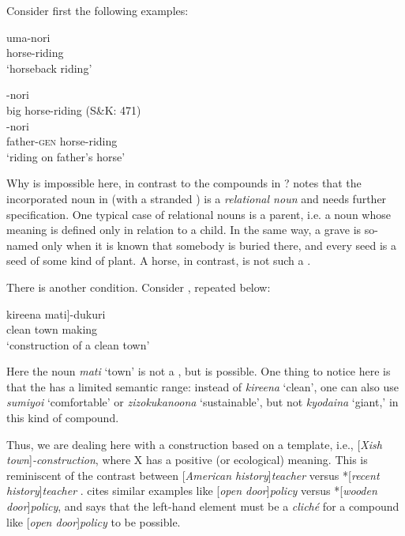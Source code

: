 \documentclass[output=paper]{LSP/langsci}
\begin{document}
  Consider first the following examples:

\ea
 \ea  
 \gll uma-nori\\
    horse-riding\\
\glt ‘horseback riding’

  \ex
  -nori\\
      {\db}{\db}big   horse-riding    (S\&K: 471)\\
  \ex
  -nori\\
     {\db}{\db}father-\textsc{gen}  horse-riding\\
\glt ‘riding on father’s horse’
\z \z

Why is   impossible here, in contrast to the compounds in ? \citet[334]{Kageyama1993} notes that the incorporated noun in  (with a stranded ) is a \textit{relational noun} and needs further specification. One typical case of relational nouns is a parent, i.e. a noun whose meaning is defined only in relation to a child. In the same way, a grave is so-named only when it is known that somebody is buried there, and every seed is a seed of some kind of plant. A horse, in contrast, is not such a .

  There is another condition. Consider , repeated below:

\ea%
\gll {\ob}kireena mati]-dukuri\\
    clean  {town  making}\\
\glt ‘construction of a clean town’
    \z

Here the noun \textit{mati} ‘town’ is not a , but   is possible. One thing to notice here is that the  has a limited semantic range: instead of \textit{kireena} ‘clean’, one can also use \textit{sumiyoi} ‘comfortable’ or \textit{zizokukanoona} ‘sustainable’, but not \textit{kyodaina} ‘giant,’ in this kind of compound.

Thus, we are dealing here with a construction based on a template, i.e., [\textit{Xish town}]\textit{-construction}, where X has a positive (or ecological) meaning. This is reminiscent of the contrast between [\textit{American history}]\textit{teacher} versus *[\textit{recent history}]\textit{teacher} \citep[193f]{BresnanMchombo1995}. \citet[81f]{Carstairs-McCarthy2002} cites similar examples like [\textit{open door}]\textit{policy} versus *[\textit{wooden door}]\textit{policy}, and says that the left-hand element must be a \textit{cliché} for a  compound like [\textit{open door}]\textit{policy} to be possible.\largerpage
\end{document}
